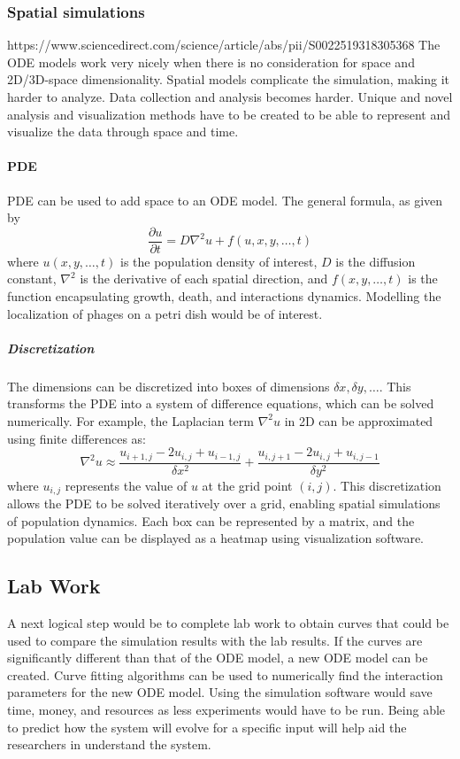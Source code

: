 \subsubsection{Spatial simulations}
https://www.sciencedirect.com/science/article/abs/pii/S0022519318305368
The ODE models work very nicely when there is no consideration for space and 2D/3D-space dimensionality. 
Spatial models complicate the simulation, making it harder to analyze. 
Data collection and analysis becomes harder. 
Unique and novel analysis and visualization methods have to be created to be able to represent and visualize the data through space and time. 
\paragraph{PDE}
PDE can be used to add space to an ODE model. 
The general formula, as given by 
\[
    \frac{\partial u}{\partial t} = D\nabla^2u + f(u, x, y, \dots, t)
\] where $u(x, y, \dots, t)$ is the population density of interest, $D$ is the diffusion constant, $\nabla^2$ is the derivative of each spatial direction, and $f(x, y, \dots, t)$ is the function encapsulating growth, death, and interactions dynamics. 
Modelling the localization of phages on a petri dish would be of interest. 

\subparagraph{Discretization}
The dimensions can be discretized into boxes of dimensions $\delta x, \delta y, \dots$. 
This transforms the PDE into a system of difference equations, which can be solved numerically. 
For example, the Laplacian term $\nabla^2 u$ in 2D can be approximated using finite differences as:
\[
    \nabla^2 u \approx \frac{u_{i+1,j} - 2u_{i,j} + u_{i-1,j}}{\delta x^2} + \frac{u_{i,j+1} - 2u_{i,j} + u_{i,j-1}}{\delta y^2}
\]
where $u_{i,j}$ represents the value of $u$ at the grid point $(i, j)$. 
This discretization allows the PDE to be solved iteratively over a grid, enabling spatial simulations of population dynamics. 
Each box can be represented by a matrix, and the population value can be displayed as a heatmap using visualization software. 

\subsection{Lab Work}
A next logical step would be to complete lab work to obtain curves that could be used to compare the simulation results with the lab results. 
If the curves are significantly different than that of the ODE model, a new ODE model can be created. 
Curve fitting algorithms can be used to numerically find the interaction parameters for the new ODE model. 
Using the simulation software would save time, money, and resources as less experiments would have to be run. 
Being able to predict how the system will evolve for a specific input will help aid the researchers in understand the system. 

